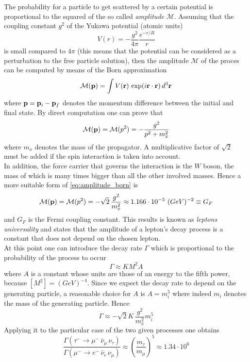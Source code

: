 The probability for a particle to get scattered by a certain potential is proportional to the squared of the so called \emph{amplitude} $\mathcal{M}$.
Assuming that the coupling constant $g^2$ of the Yukawa potential (atomic units)
\begin{equation*}
    V(r) = -\frac{g^2}{4\pi} \frac{e^{-r/R}}{r}
\end{equation*}
is small compared to $4\pi$ (this means that the potential can be considered as a perturbation to the free particle solution), then the amplitude $\mathcal{M}$ of the proces can be computed by means of the Born approximation
\begin{equation*}
    \mathcal{M}(\mathbf{p}) = \int V(\mathbf{r}) \, \exp(i\mathbf{r}\cdot\mathbf{r}) \, d^3\mathbf{r}
\end{equation*}
where $\mathbf{p} = \mathbf{p}_i - \mathbf{p}_f$ denotes the momentum difference between the initial and final state. By direct computation one can prove that 
\begin{equation}
    \mathcal{M}(\mathbf{p}) = \mathcal{M}(p^2) = - \frac{g^2}{p^2 + m_x^2}
    \label{eq:amplitude_born}
\end{equation}
where $m_x$ denotes the mass of the propagator. A multiplicative factor of $\sqrt{2}$ must be added if the spin interaction is taken into account. \\
In addition, the force carrier that governs the interaction is the $W$ boson, the mass of which is many times bigger than all the other involved masses. Hence a more suitable form of 
\ref{eq:amplitude_born} is 
\begin{equation*}
    \mathcal{M}(\mathbf{p}) = \mathcal{M}(p^2) = - \sqrt{2} \, \frac{g^2}{m_x^2} \approx 1.166 \cdot 10^{-5}~(GeV)^{-2} \equiv G_F
\end{equation*}
and $G_F$ is the Fermi coupling constant.
This results is known as \emph{leptons universality} and states that the amplitude of a lepton's decay process is a constant that does not depend on the chosen lepton. \\
At this point one can introduce the decay rate $\Gamma$ which is proportional to the probability of the process to occur
\begin{equation*}
    \Gamma \approx K M^2 A
\end{equation*}
where $A$ is a constant whose units are those of an energy to the fifth power, because $[M^2] = (GeV)^{-4}$. Since we expect the decay rate 
to depend on the generating particle, a reasonable choice for $A$ is $A=m_i^5$ where indeed $m_i$ denotes the mass of the generating particle. Hence
\begin{equation*}
    \Gamma \approx - \sqrt{2} K \, \frac{g^2}{m_x^2}m_i^5
\end{equation*}
Applying it to the particular case of the two given processes one obtains
\begin{equation}
    \frac{\Gamma\left(\tau^- \rightarrow \mu^- \, \bar\nu_{\mu} \, \nu_{\tau}\right)}{\Gamma\left( \mu^- \rightarrow e^- \, \bar\nu_e \, \nu_{\mu}\right)}
    \approx \left(\frac{m_{\tau}}{m_{\mu}}\right)^5 \approx 1.34 \cdot 10^6
    \label{eq:decay_widths_ratios}
\end{equation}

